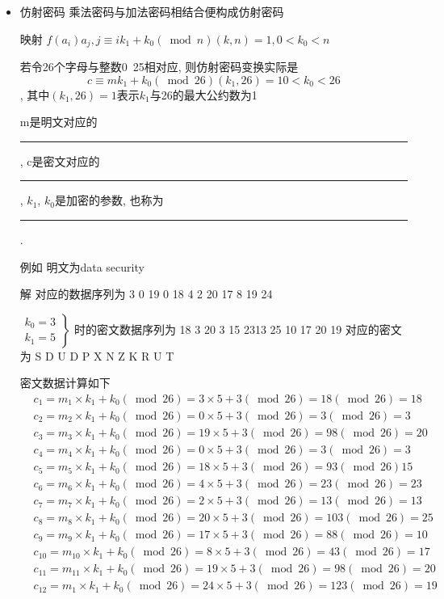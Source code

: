 \documentclass[UTF8]{ctexart}
\newcommand\hl{\bgroup\markoverwith
  {\textcolor{yellow}{\rule[-.5ex]{2pt}{2.5ex}}}\ULon}
\begin{document}
\begin{itemize}
        \item 仿射密码
        乘法密码与加法密码相结合便构成仿射密码

        映射 $f(a_i)a_j, j\equiv ik_1+k_0(\bmod n) (k, n)=1, 0<k_0<n$

        若令26个字母与整数0~25相对应, 则仿射密码变换实际是
        $$c\equiv mk_1 + k_0(\bmod 26) (k_1, 26)=1 0<k_0<26$$, 其中$(k_1, 26)=1$表示$k_1$与26的最大公约数为1

        m是明文对应的\hl{明文数据}, c是密文对应的\hl{密文数据}, $k_1$, $k_0$是加密的参数, 也称为\hl{密钥}.

        例如 明文为data security

        解 对应的数据序列为 3 0 19 0 18 4 2 20 17 8 19 24

        $\left. \begin{array}{c}{k_0=3}\\ {k_1=5} \end{array}\right \}$
        时的密文数据序列为 18 3 20 3 15 2313 25 10 17 20 19
        对应的密文为 S D U D P X N Z K R U T

        密文数据计算如下
        $$
        \begin{aligned}
            &c_1=m_1\times k_1 + k_0(\bmod 26)=3\times 5 + 3(\bmod 26)=18(\bmod26)=18\\
            &c_2=m_2\times k_1 + k_0(\bmod 26)=0\times 5 + 3(\bmod 26)=3(\bmod26)=3\\
            &c_3=m_3\times k_1 + k_0(\bmod 26)=19\times 5 + 3(\bmod 26)=98(\bmod26)=20\\
            &c_4=m_4\times k_1 + k_0(\bmod 26)=0\times 5 + 3(\bmod 26)=3(\bmod26)=3\\
            &c_5=m_5\times k_1 + k_0(\bmod 26)=18\times 5 + 3(\bmod 26)=93(\bmod26)15\\
            &c_6=m_6\times k_1 + k_0(\bmod 26)=4\times 5 + 3(\bmod 26)=23(\bmod26)=23\\
            &c_7=m_7\times k_1 + k_0(\bmod 26)=2\times 5 + 3(\bmod 26)=13(\bmod26)=13\\
            &c_8=m_8\times k_1 + k_0(\bmod 26)=20\times 5 + 3(\bmod 26)=103(\bmod26)=25\\
            &c_9=m_9\times k_1 + k_0(\bmod 26)=17\times 5 + 3(\bmod 26)=88(\bmod26)=10\\
            &c_10=m_10\times k_1 + k_0(\bmod 26)=8\times 5 + 3(\bmod 26)=43(\bmod26)=17\\
            &c_11=m_11\times k_1 + k_0(\bmod 26)=19\times 5 + 3(\bmod 26)=98(\bmod26)=20\\
            &c_12=m_1\times k_1 + k_0(\bmod 26)=24\times 5 + 3(\bmod 26)=123(\bmod26)=19
        \end{aligned}
        $$


\end{itemize}
\end{document}
